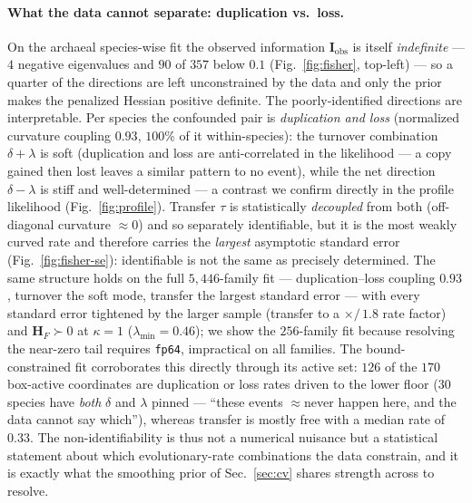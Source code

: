 \documentclass[11pt]{article}
\newcommand{\bdelta}{\delta}
\newcommand{\btau}{\tau}
\newcommand{\blambda}{\lambda}
\newcommand{\Hess}{\mathbf{H}}
\newcommand{\Fish}{\mathbf{I}}
\begin{document}
\paragraph{What the data cannot separate: duplication vs.\ loss.} On the
archaeal species-wise fit the observed information $\Fish_{\mathrm{obs}}$ is
itself \emph{indefinite} --- $4$ negative eigenvalues and $90$ of $357$ below
$0.1$ (Fig.~\ref{fig:fisher}, top-left) --- so a quarter of the directions are
left unconstrained by the data and only the prior makes the penalized Hessian
positive definite. The poorly-identified directions are interpretable. Per
species the confounded pair is \emph{duplication and loss} (normalized curvature
coupling $0.93$, $100\%$ of it within-species): the turnover combination
$\bdelta+\blambda$ is soft (duplication and loss are anti-correlated in the
likelihood --- a copy gained then lost leaves a similar pattern to no event),
while the net direction $\bdelta-\blambda$ is stiff and well-determined --- a
contrast we confirm directly in the profile likelihood (Fig.~\ref{fig:profile}).
Transfer
$\btau$ is statistically \emph{decoupled} from both (off-diagonal curvature
$\approx0$) and so separately identifiable, but it is the most weakly curved rate
and therefore carries the \emph{largest} asymptotic standard error
(Fig.~\ref{fig:fisher-se}): identifiable is not the same as precisely determined.
The same structure holds on the full $5{,}446$-family fit --- duplication--loss
coupling $0.93$, turnover the soft mode, transfer the largest standard error ---
with every standard error tightened by the larger sample (transfer to a
$\times/\,1.8$ rate factor) and $\Hess_F\succ0$ at $\kappa{=}1$
($\lambda_{\min}{=}0.46$); we show the $256$-family fit because resolving the
near-zero tail requires \texttt{fp64}, impractical on all families.
The bound-constrained fit corroborates this
directly through its active set: $126$ of the $170$ box-active coordinates are
duplication or loss rates driven to the lower floor ($30$ species have
\emph{both} $\bdelta$ and $\blambda$ pinned --- ``these events $\approx$never
happen here, and the data cannot say which''), whereas transfer is mostly free
with a median rate of $0.33$. The non-identifiability is thus not a numerical
nuisance but a statistical statement about which evolutionary-rate combinations the
data constrain, and it is exactly what the smoothing prior of Sec.~\ref{sec:cv}
shares strength across to resolve.
\end{document}

